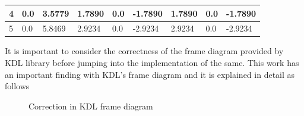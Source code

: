 \begin{table}[h]
\begin{tabular}{|l|l|l|l|l|l|l|l|l|l|}
\multicolumn{2}{|l|}{4}                                                                              & 0.0          & 3.5779       & 1.7890          & 0.0             & -1.7890                 & 1.7890                  & 0.0                        & -1.7890                    \\ \hline
\multicolumn{2}{|l|}{5}                                                                              & 0.0          & 5.8469       & 2.9234          & 0.0             & -2.9234                 & 2.9234                  & 0.0                        & -2.9234                    \\ \hline
\end{tabular}
\end{table}

It is important to consider the correctness of the frame diagram provided by KDL library before jumping into the implementation of the same. This work has an important finding with KDL's frame diagram and it is explained in detail as follows

\begin{figure}[h]
\centering     %
{}
\caption{Correction in KDL frame diagram}
\end{figure}


